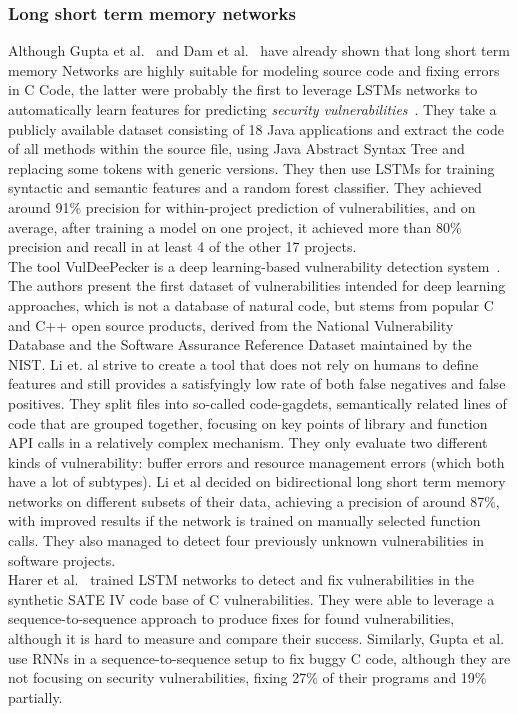 \documentclass[
a4paper,
pagesize,
pdftex,
12pt,
ngerman,
fleqn,
final,
]{scrartcl}
\begin{document}
	\subsubsection{Long short term memory networks}
	Although Gupta et al.~\cite{Gupta.2017b} and Dam et al.~\cite{Dam.2016b} have already shown that long short term memory Networks are highly suitable for modeling source code and fixing errors in C Code, the latter were probably the first to leverage LSTMs networks to automatically learn features for predicting \textit{security vulnerabilities}~\cite{Dam.2017}. They take a publicly available dataset consisting of 18 Java applications and extract the code of all methods within the source file, using Java Abstract Syntax Tree and replacing some tokens with generic versions. They then use LSTMs for training syntactic and semantic features and a random forest classifier. They achieved around 91\% precision for within-project prediction of vulnerabilities, and on average, after training a model on one project, it achieved more than 80\% precision and recall in at least 4 of the other 17 projects.\\
	The tool VulDeePecker is a deep learning-based vulnerability detection system~\cite{Li.2018}. The authors present the first dataset of vulnerabilities intended for deep learning approaches, which is not a database of natural code, but stems from popular C and C++ open source products, derived from the National Vulnerability Database and the Software Assurance Reference Dataset maintained by the NIST. Li et. al strive to create a tool that does not rely on humans to define features and still provides a satisfyingly low rate of both false negatives and false positives. They split files into so-called code-gagdets, semantically related lines of code that are grouped together, focusing on key points of library and function API calls in a relatively complex mechanism. They only evaluate two different kinds of vulnerability: buffer errors and resource management errors (which both have a lot of subtypes). Li et al decided on bidirectional long short term memory networks on different subsets of their data, achieving a precision of around 87\%, with improved results if the network is trained on manually selected function calls. They also managed to detect four previously unknown vulnerabilities in software projects. \\
	Harer et al.~\cite{Harer.2018} trained LSTM networks to detect and fix vulnerabilities in the synthetic SATE IV code base of C vulnerabilities. They were able to leverage a sequence-to-sequence approach to produce fixes for found vulnerabilities, although it is hard to measure and compare their success. Similarly, Gupta et al.~\cite{Gupta.2017} use RNNs in a sequence-to-sequence setup to fix buggy C code, although they are not focusing on security vulnerabilities, fixing 27\% of their programs and 19\% partially.
	
\end{document}
